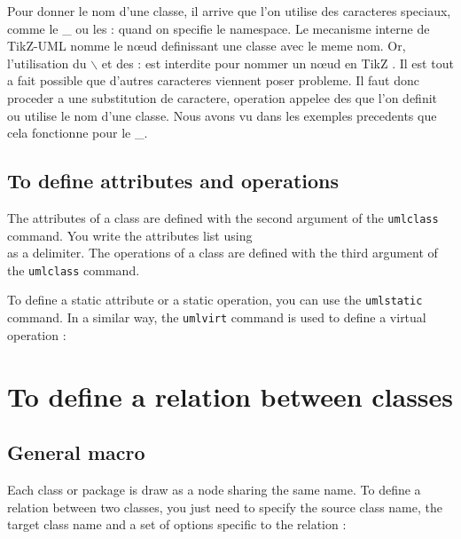 \documentclass[a4paper,11pt]{report}
\newcommand{\inputTikZ}[1]{%
  }%
\newcommand{\inputTikZ}[1]{%
    \texttt{[image: fig/\#1.pdf]}%
  }%
\newcommand{\tuml}{{\sc TikZ-UML} \xspace}
\newcommand{\TikZ}{{\sc TikZ} \xspace}
\begin{document}
Pour donner le nom d'une classe, il arrive que l'on utilise des caracteres speciaux, comme le \_{} ou les : quand on specifie le namespace. Le mecanisme interne de \tuml{} nomme le n\oe{}ud definissant une classe avec le meme nom. Or, l'utilisation du $\backslash$ et des : est interdite pour nommer un n\oe{}ud en \TikZ. Il est tout a fait possible que d'autres caracteres viennent poser probleme. Il faut donc proceder a une substitution de caractere, operation appelee des que l'on definit ou utilise le nom d'une classe. Nous avons vu dans les exemples precedents que cela fonctionne pour le \_{}.

\subsection{To define attributes and operations}\label{ss.attrop}

The attributes of a class are defined with the second argument of the {\tt umlclass} command. You write the attributes list using {\tt \\} as a delimiter. The operations of a class are defined with the third argument of the {\tt umlclass} command. 

To define a static attribute or a static operation, you can use the {\tt umlstatic} command. In a similar way, the {\tt umlvirt} command is used to define a virtual operation :

\medskip

\begin{minipage}{0.5\textwidth}

\end{minipage}
\begin{minipage}{0.4\textwidth}
\begin{center}
\inputTikZ{attr-and-op}
\end{center}
\end{minipage}

\section{To define a relation between classes}\label{s.rel}

\subsection{General macro}\label{ss.relgen}

Each class or package is draw as a node sharing the same name. To define a relation
between two classes, you just need to specify the source class name, the target class name and a set of options specific to the relation :
\end{document}
